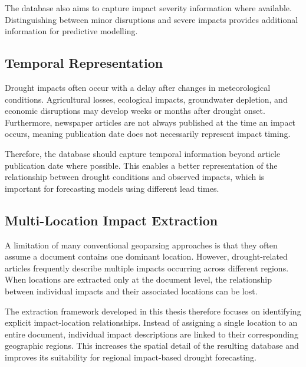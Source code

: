 The database also aims to capture impact severity information where available. Distinguishing between minor disruptions and severe impacts provides additional information for predictive modelling.

\subsection{Temporal Representation}

Drought impacts often occur with a delay after changes in meteorological conditions. Agricultural losses, ecological impacts, groundwater depletion, and economic disruptions may develop weeks or months after drought onset. Furthermore, newspaper articles are not always published at the time an impact occurs, meaning publication date does not necessarily represent impact timing.

Therefore, the database should capture temporal information beyond article publication date where possible. This enables a better representation of the relationship between drought conditions and observed impacts, which is important for forecasting models using different lead times.

\subsection{Multi-Location Impact Extraction}

A limitation of many conventional geoparsing approaches is that they often assume a document contains one dominant location. However, drought-related articles frequently describe multiple impacts occurring across different regions. When locations are extracted only at the document level, the relationship between individual impacts and their associated locations can be lost.

The extraction framework developed in this thesis therefore focuses on identifying explicit impact-location relationships. Instead of assigning a single location to an entire document, individual impact descriptions are linked to their corresponding geographic regions. This increases the spatial detail of the resulting database and improves its suitability for regional impact-based drought forecasting.